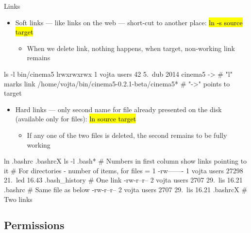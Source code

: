 \documentclass[compress, ucs, xelatex, 11pt, xcolor=svgnames,
  hyperref={
    bookmarks=true,
    unicode=true,
    colorlinks=true,
    pdftitle={Linux, command line and MetaCentrum},
    plainpages=false,
    pdfauthor={Vojtech Zeisek},
    pdfsubject={Course about use of Linux command line, writing shell scripts and using MetaCentrum of CESNET},
    pdfcreator={XeLaTeX},
    pdfkeywords={Linux, GNU, BASH, shell, command line, MetaCentrum},
    linkcolor=DarkRed,
    anchorcolor=DarkBlue,
    citecolor=Indigo,
    filecolor=NavyBlue,
    menucolor=DarkMagenta,
    urlcolor=DarkBlue,
    pdftex},
  url={hyphens, lowtilde} %
  ]{beamer}
\renewcommand{\texttt}[1]{\hl{\ttfamily #1}}
\begin{document}
\begin{frame}[fragile]{Links}
  \label{links}
  \begin{itemize}
    \item Soft links --- like links on the web --- short-cut to another place: \texttt{ln -s source target}
    \begin{itemize}
      \item When we delete link, nothing happens, when target, non-working link remains
    \end{itemize}
  \end{itemize}
  \begin{bashcode}
    ls -l bin/cinema5
    lrwxrwxrwx 1 vojta users 42 5. dub 2014 cinema5 -> # "l" marks link
      /home/vojta/bin/cinema5-0.2.1-beta/cinema5* # "->" points to target
  \end{bashcode}
  \begin{itemize}
    \item Hard links --- only second name for file already presented on the disk (available only for files): \texttt{ln source target}
    \begin{itemize}
      \item If any one of the two files is deleted, the second remains to be fully working
    \end{itemize}
  \end{itemize}
  \begin{bashcode}
    ln .bashrc .bashrcX
    ls -l .bash* # Numbers in first column show links pointing to it
                 # For directories - number of items, for files = 1
    -rw------- 1 vojta users 27298 21. led 16.43 .bash_history # One link
    -rw-r--r-- 2 vojta users  2707 29. lis 16.21 .bashrc # Same file as below
    -rw-r--r-- 2 vojta users  2707 29. lis 16.21 .bashrcX # Two links
  \end{bashcode}
\end{frame}

\subsection{Permissions}
\end{document}
